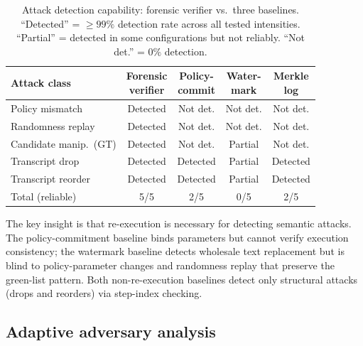 \documentclass[conference]{IEEEtran}
\begin{document}
\begin{table}[t]
\caption{Attack detection capability: forensic verifier vs.\ three baselines. ``Detected'' = ${\geq}99\%$ detection rate across all tested intensities. ``Partial'' = detected in some configurations but not reliably. ``Not det.'' = $0\%$ detection.}\label{tab:baseline}
\centering
\setlength{\tabcolsep}{3.0pt}
\begin{tabular}{@{}lcccc@{}}
\toprule
Attack class & \makecell{Forensic\\verifier} & \makecell{Policy-\\commit} & \makecell{Water-\\mark} & \makecell{Merkle\\log} \\
\midrule
Policy mismatch            & Detected & Not det. & Not det. & Not det. \\
Randomness replay          & Detected & Not det. & Not det. & Not det. \\
Candidate manip.\ (GT)     & Detected & Not det. & Partial  & Not det. \\
Transcript drop            & Detected & Detected & Partial  & Detected \\
Transcript reorder         & Detected & Detected & Partial  & Detected \\
\midrule
Total (reliable)           & 5/5      & 2/5      & 0/5      & 2/5 \\
\bottomrule
\end{tabular}
\end{table}

The key insight is that re-execution is necessary for detecting semantic attacks. The policy-commitment baseline binds parameters but cannot verify execution consistency; the watermark baseline detects wholesale text replacement but is blind to policy-parameter changes and randomness replay that preserve the green-list pattern. Both non-re-execution baselines detect only structural attacks (drops and reorders) via step-index checking.

\subsection{Adaptive adversary analysis}
\end{document}
